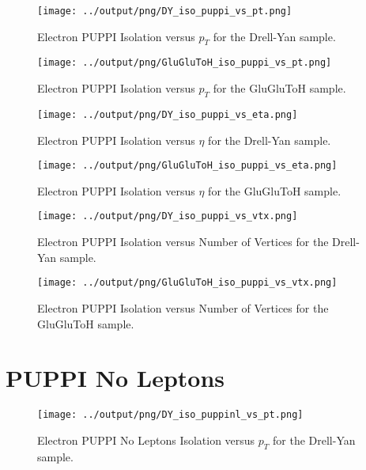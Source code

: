 \documentclass[11pt]{book}
\begin{document}
\begin{figure}[htb]
\centering
\texttt{[image: ../output/png/DY\_iso\_puppi\_vs\_pt.png]}
\caption{Electron PUPPI Isolation versus $p_{T}$ for the Drell-Yan sample.}
\label{fig:dy_iso_puppi_vs_pt}
\end{figure}

\begin{figure}[htb]
\centering
\texttt{[image: ../output/png/GluGluToH\_iso\_puppi\_vs\_pt.png]}
\caption{Electron PUPPI Isolation versus $p_{T}$ for the GluGluToH sample.}
\label{fig:ggh_iso_puppi_vs_pt}
\end{figure}

\begin{figure}[htb]
\centering
\texttt{[image: ../output/png/DY\_iso\_puppi\_vs\_eta.png]}
\caption{Electron PUPPI Isolation versus $\eta$ for the Drell-Yan sample.}
\label{fig:dy_iso_puppi_vs_eta}
\end{figure}

\begin{figure}[htb]
\centering
\texttt{[image: ../output/png/GluGluToH\_iso\_puppi\_vs\_eta.png]}
\caption{Electron PUPPI Isolation versus $\eta$ for the GluGluToH sample.}
\label{fig:ggh_iso_puppi_vs_eta}
\end{figure}

\begin{figure}[htb]
\centering
\texttt{[image: ../output/png/DY\_iso\_puppi\_vs\_vtx.png]}
\caption{Electron PUPPI Isolation versus Number of Vertices for the Drell-Yan sample.}
\label{fig:dy_iso_puppi_vs_vtx}
\end{figure}

\begin{figure}[htb]
\centering
\texttt{[image: ../output/png/GluGluToH\_iso\_puppi\_vs\_vtx.png]}
\caption{Electron PUPPI Isolation versus Number of Vertices for the GluGluToH sample.}
\label{fig:ggh_iso_puppi_vs_vtx}
\end{figure}
\clearpage


\section{PUPPI No Leptons}

\begin{figure}[htb]
\centering
\texttt{[image: ../output/png/DY\_iso\_puppinl\_vs\_pt.png]}
\caption{Electron PUPPI No Leptons Isolation versus $p_{T}$ for the Drell-Yan sample.}
\label{fig:dy_iso_puppinl_vs_pt}
\end{figure}
\end{document}
